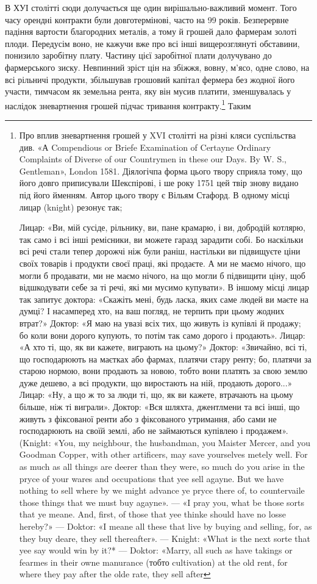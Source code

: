 В ХУІ столітті сюди долучається ще один вирішально-важливий
момент. Того часу орендні контракти були довготермінові,
часто на 99 років. Безперервне падіння вартости благородних
металів, а тому й грошей дало фармерам золоті плоди. Передусім
воно, не кажучи вже про всі інші вищерозглянуті обставини,
понизило заробітну плату. Частину цієї заробітної плати долучувано
до фармерського зиску. Невпинний зріст цін на збіжжя,
вовну, м’ясо, одне слово, на всі рільничі продукти, збільшував
грошовий капітал фермера без жодної його участи, тимчасом
як земельна рента, яку він мусив платити, зменшувалась у наслідок
зневартнення грошей підчас тривання контракту.\footnote{
Про вплив зневартнення грошей у XVI столітті на різні кляси
суспільства див. «А Compendious or Briefe Examination of Certayne Ordinary
Complaints of Diverse of our Countrymen in these our Days. By
W. S., Gentleman», London 1581. Діялогічпа форма цього твору сприяла
тому, що його довго приписували Шекспірові, і ше року 1751 цей твір
знову видано під його йменням. Автор цього твору є Вільям Стафорд.
В одному місці лицар (knight) резонує так;

Лицар: «Ви, мій сусіде, рільнику, ви, пане крамарю, і ви, добродій
котлярю, так само і всі інші ремісники, ви можете гаразд зарадити
собі. Бо наскільки всі речі стали тепер дорожчі ніж були раніш, настільки
ви підвищуєте ціни своїх товарів і продукти своєї праці, які продаєте.
А ми не маємо нічого, що могли б продавати, ми не маємо нічого, на що
могли б підвищити ціну, щоб відшкодувати себе за ті речі, які ми мусимо
купувати». В іншому місці лицар так запитує доктора: «Скажіть мені,
будь ласка, яких саме людей ви маєте на думці? І насамперед хто, на
ваш погляд, не терпить при цьому жодних втрат?» Доктор: «Я маю на
увазі всіх тих, що живуть із купівлі й продажу; бо коли вони дорого
купують, то потім так само дорого і продають». Лицар: «А хто ті, що,
як ви кажете, виграють на цьому?» Доктор: «Звичайно, всі ті, що господарюють
на маєтках або фармах, платячи стару ренту; бо, платячи за старою
нормою, вони продають за новою, тобто вони платять за свою землю
дуже дешево, а всі продукти, що виростають на ній, продають дорого...»
Лицар: «Ну, а що ж то за люди ті, що, як ви кажете, втрачають на цьому
більше, ніж ті виграли». Доктор: «Вся шляхта, джентлмени та всі інші,
що живуть з фіксованої ренти або з фіксованого утримання, або сами
не господарюють на своїй землі, або не займаються купівлею і продажем».
(Knight: «You, my neighbour, the husbandman, you Maister Mercer,
and you Goodman Copper, with other artificers, may save yourselves
metely well. For as much as all things are deerer than they were, so much
do you arise in the pryce of your wares and occupations that yee sell agayne.
But we have nothing to sell where by we might advance ye pryce there of,
to countervaile those things that we must buy agayne». — «I pray you, what
be those sorts that ye meane. And, first, of those that yee thinke should
have no losse hereby?» — Doktor: «I meane all these that live by buying
and selling, for, as they buy deare, they sell thereafter». — Knight: «What
is the next sorte that yee say would win by it?* — Doktor: «Marry, all
such as have takings or fearmes in their owne manurance (тобто cultivation)
at the old rent, for where they pay after the olde rate, they sell after
} Таким
